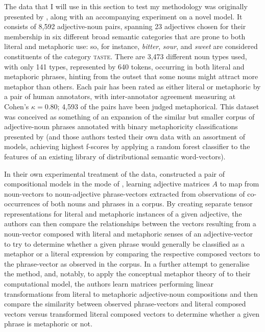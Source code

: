 The data that I will use in this section to test my methodology was originally presented by \cite{GutierrezEA2016}, along with an accompanying experiment on a novel model.  It consists of 8,592 adjective-noun pairs, spanning 23 adjectives chosen for their membership in six different broad semantic categories that are prone to both literal and metaphoric use: so, for instance, \emph{bitter}, \emph{sour}, and \emph{sweet} are considered constituents of the category \textsc{taste}.  There are 3,473 different noun types used, with only 141 types, represented by 640 tokens, occurring in both literal and metaphoric phrases, hinting from the outset that some nouns might attract more metaphor than others.  Each pair has been rated as either literal or metaphoric by a pair of human annotators, with inter-annotator agreement measuring at Cohen's $\kappa = 0.80$; 4,593 of the pairs have been judged metaphorical.  This dataset was conceived as something of an expansion of the similar but smaller corpus of adjective-noun phrases annotated with binary metaphoricity classifications presented by \cite{TsvetkovEA2014} (and those authors tested their own data with an assortment of models, achieving highest f-scores by applying a random forest classifier to the features of an existing library of distributional semantic word-vectors).

In their own experimental treatment of the data, \citeauthor{GutierrezEA2016} constructed a pair of compositional models in the mode of \cite{BaroniEA2010}, learning adjective matrices $A$ to map from noun-vectors to noun-adjective phrase-vectors extracted from observations of co-occurrences of both nouns and phrases in a corpus.  By creating separate tensor representations for literal and metaphoric instances of a given adjective, the authors can then compare the relationships between the vectors resulting from a noun-vector composed with literal and metaphoric senses of an adjective-vector to try to determine whether a given phrase would generally be classified as a metaphor or a literal expression by comparing the respective composed vectors to the phrase-vector as observed in the corpus.  In a further attempt to generalise the method, and, notably, to apply the conceptual metaphor theory of \cite{LakoffEA1980} to their computational model, the authors learn matrices performing linear transformations from literal to metaphoric adjective-noun compositions and then compare the similarity between observed phrase-vectors and literal composed vectors versus transformed literal composed vectors to determine whether a given phrase is metaphoric or not.

